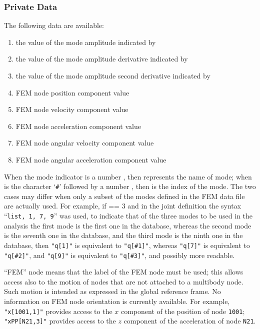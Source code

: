 \subsubsection{Private Data}
The following data are available:
\begin{enumerate}
\item {} the value of the mode amplitude indicated by 
\item {} the value of the mode amplitude derivative indicated by 
\item {} the value of the mode amplitude second derivative indicated by 
\item {} FEM node  position  component value
\item {} FEM node  velocity  component value
\item {} FEM node  acceleration  component value
\item {} FEM node  angular velocity  component value
\item {} FEM node  angular acceleration  component value
\end{enumerate}
When the mode indicator  is a number , then  represents the name of mode;
when  is the character `\verb;#;' followed by a number ,
then  is the index of the mode.
The two cases may differ when only a subset of the modes defined
in the FEM data file are actually used.
For example, if  == 3 and in the joint definition
the syntax ``\verb;list, 1, 7, 9;'' was used, to indicate that of the three modes to be used in the analysis
the first mode is the first one in the database, whereas the second mode is the seventh one in the database,
and the third mode is the ninth one in the database,
then \verb;"q[1]"; is equivalent to \verb;"q[#1]";,
whereas \verb;"q[7]"; is equivalent to \verb;"q[#2]";,
and \verb;"q[9]"; is equivalent to \verb;"q[#3]";,
and possibly more readable.

``FEM'' node means that the label of the FEM node must be used;
this allows access also to the motion of nodes that are not attached
to a multibody node.
Such motion is intended as expressed in the global reference frame.
No information on FEM node orientation is currently available.
For example, \verb;"x[1001,1]"; provides access to the $x$ component of the position of node \verb;1001;;
\verb;"xPP[N21,3]"; provides access to the $z$ component of the acceleration of node \verb;N21;.




